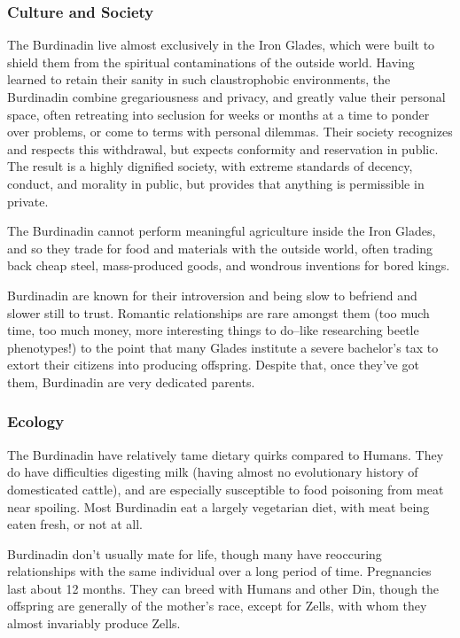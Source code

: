 \documentclass[oneside,11pt,english]{book}
\begin{document}
 

\subsubsection*{Culture and Society} 
The Burdinadin live almost exclusively in the Iron Glades, which were built to shield them from the 
spiritual contaminations of the outside world. Having learned to retain their sanity in such claustrophobic 
environments, the Burdinadin combine gregariousness and privacy, and greatly value their personal 
space, often retreating into seclusion for weeks or months at a time to ponder over problems, or come to 
terms with personal dilemmas. Their society recognizes and respects this withdrawal, but expects 
conformity and reservation in public. The result is a highly dignified society, with extreme standards of 
decency, conduct, and morality in public, but provides that anything is permissible in private. 

 

The Burdinadin cannot perform meaningful agriculture inside the Iron Glades, and so they trade for food 
and materials with the outside world, often trading back cheap steel, mass-produced goods, and wondrous 
inventions for bored kings. 

 


Burdinadin are known for their introversion and being slow to befriend and slower still to trust. Romantic 
relationships are rare amongst them (too much time, too much money, more interesting things to do--like 
researching beetle phenotypes!) to the point that many Glades institute a severe bachelor’s tax to extort 
their citizens into producing offspring. Despite that, once they’ve got them, Burdinadin are very dedicated 
parents. 

 

\subsubsection*{Ecology} 
The Burdinadin have relatively tame dietary quirks compared to Humans. They do have difficulties 
digesting milk (having almost no evolutionary history of domesticated cattle), and are especially 
susceptible to food poisoning from meat near spoiling. Most Burdinadin eat a largely vegetarian diet, with 
meat being eaten fresh, or not at all. 


Burdinadin don’t usually mate for life, though many have reoccuring relationships with the same individual over a long period of time. Pregnancies last about 12 months. They can breed with Humans and other Din, though the offspring are generally of the mother's race, except for Zells, with whom they almost invariably produce Zells. 
\end{document}
